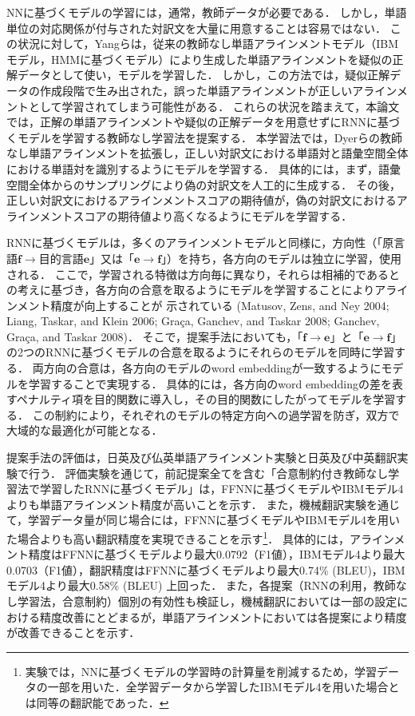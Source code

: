\documentclass[japanese]{jnlp_1.4}
\begin{document}
NNに基づくモデルの学習には，通常，教師データが必要である．
しかし，単語単位の対応関係が付与された対訳文を大量に用意することは容易ではない．
この状況に対して，Yangらは，従来の教師なし単語アラインメントモデル（IBMモデル，HMMに基づくモデル）により生成した単語アラインメントを疑似の正解データとして使い，モデルを学習した\cite{yang13}．
しかし，この方法では，疑似正解データの作成段階で生み出された，誤った単語アラインメントが正しいアラインメントとして学習されてしまう可能性がある．
これらの状況を踏まえて，本論文では，正解の単語アラインメントや疑似の正解データを用意せずにRNNに基づくモデルを学習する教師なし学習法を提案する．
本学習法では，Dyerらの教師なし単語アラインメント\cite{dyer11}を拡張し，正しい対訳文における単語対と語彙空間全体における単語対を識別するようにモデルを学習する．
具体的には，まず，語彙空間全体からのサンプリングにより偽の対訳文を人工的に生成する．
その後，正しい対訳文におけるアラインメントスコアの期待値が，偽の対訳文におけるアラインメントスコアの期待値より高くなるようにモデルを学習する．


RNNに基づくモデルは，多くのアラインメントモデルと同様に，方向性（「原言語$\boldsymbol{f}\rightarrow$目的言語$\boldsymbol{e}$」又は「$\boldsymbol{e}\rightarrow\boldsymbol{f}$」）を持ち，各方向のモデルは独立に学習，使用される．
ここで，学習される特徴は方向毎に異なり，それらは相補的であるとの考えに基づき，各方向の合意を取るようにモデルを学習することによりアラインメント精度が向上することが
    示されている (Matusov, Zens, and Ney 2004; Liang, Taskar, and Klein 2006; Gra\c{c}a, Ganchev, and Taskar 2008; Ganchev, Gra\c{c}a, and Taskar 2008)．\nocite{matusov04,liang06,graca08,gancev08}
そこで，提案手法においても，「$\boldsymbol{f}\rightarrow\boldsymbol{e}$」と「$\boldsymbol{e}\rightarrow\boldsymbol{f}$」の2つのRNNに基づくモデルの合意を取るようにそれらのモデルを同時に学習する．
両方向の合意は，各方向のモデルのword embeddingが一致するようにモデルを学習することで実現する．
具体的には，各方向のword embeddingの差を表すペナルティ項を目的関数に導入し，その目的関数にしたがってモデルを学習する．
この制約により，それぞれのモデルの特定方向への過学習を防ぎ，双方で大域的な最適化が可能となる．

提案手法の評価は，日英及び仏英単語アラインメント実験と日英及び中英翻訳実験で行う．
評価実験を通じて，前記提案全てを含む「合意制約付き教師なし学習法で学習したRNNに基づくモデル」は，FFNNに基づくモデルやIBMモデル4よりも単語アラインメント精度が高いことを示す．
また，機械翻訳実験を通じて，学習データ量が同じ場合には，FFNNに基づくモデルやIBMモデル4を用いた場合よりも高い翻訳精度を実現できることを示す\footnote{実験では，NNに基づくモデルの学習時の計算量を削減するため，学習データの一部を用いた．全学習データから学習したIBMモデル4を用いた場合とは同等の翻訳能であった．}．
具体的には，アラインメント精度はFFNNに基づくモデルより最大0.0792（F1値），IBMモデル4より最大0.0703（F1値），翻訳精度はFFNNに基づくモデルより最大0.74\% (BLEU)，IBMモデル4より最大0.58\% (BLEU) 上回った．
また，各提案（RNNの利用，教師なし学習法，合意制約）個別の有効性も検証し，機械翻訳においては一部の設定における精度改善にとどまるが，単語アラインメントにおいては各提案により精度が改善できることを示す．
\end{document}

